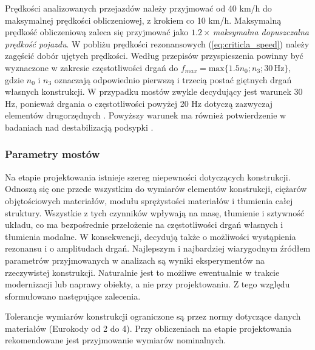 Prędkości analizowanych przejazdów należy przyjmować od 40 km/h do maksymalnej prędkości obliczeniowej, z krokiem co 10 km/h. Maksymalną prędkość obliczeniową zaleca się przyjmować jako $1.2\times\,$\textit{maksymalna dopuszczalna prędkość pojazdu}. W pobliżu prędkości rezonansowych (\ref{eq:criticla_speed}) należy zagęścić dobór ujętych prędkości. Według przepisów \parencite{PKNj,UnionInternationaleDesCheminsDeFer2009} przyspieszenia powinny być wyznaczone w zakresie częstotliwości drgań do $f_{max}=\text{max}\{1.5n_0;n_3; 30\,\text{Hz}\}$, gdzie $n_0$ i $n_3$ oznaczają odpowiednio pierwszą i trzecią postać giętnych drgań własnych konstrukcji. W przypadku mostów zwykle decydujący jest warunek 30 Hz, ponieważ drgania o częstotliwości powyżej 20 Hz dotyczą zazwyczaj elementów drugorzędnych \parencite{Oleszek2015b}. Powyższy warunek ma również potwierdzenie w badaniach nad destabilizacją podsypki \parencite{Zacher2008}.

\subsubsection{Parametry mostów}
Na etapie projektowania istnieje szereg niepewności dotyczących konstrukcji. Odnoszą się one przede wszystkim do wymiarów elementów konstrukcji, ciężarów objętościowych materiałów, modułu sprężystości materiałów i tłumienia całej struktury. Wszystkie z tych czynników wpływają na masę, tłumienie i sztywność układu, co ma bezpośrednie przełożenie na częstotliwości drgań własnych i tłumienia modalne. W konsekwencji, decydują także o możliwości wystąpienia rezonansu i o amplitudach drgań. Najlepszym i najbardziej wiarygodnym źródłem parametrów przyjmowanych w analizach są wyniki eksperymentów na rzeczywistej konstrukcji. Naturalnie jest to możliwe ewentualnie w trakcie modernizacji lub naprawy obiekty, a nie przy projektowaniu. Z tego względu sformułowano następujące zalecenia.

Tolerancje wymiarów konstrukcji ograniczone są przez normy dotyczące danych materiałów (Eurokody od 2 do 4). Przy obliczeniach na etapie projektowania rekomendowane jest przyjmowanie wymiarów nominalnych.

